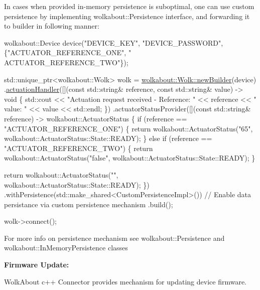 In cases when provided in-\/memory persistence is suboptimal, one can use custom persistence by implementing wolkabout\+::\+Persistence interface, and forwarding it to builder in following manner\+:


\begin{DoxyCode}
wolkabout::Device device(\textcolor{stringliteral}{"DEVICE\_KEY"}, \textcolor{stringliteral}{"DEVICE\_PASSWORD"}, \{\textcolor{stringliteral}{"ACTUATOR\_REFERENCE\_ONE"}, \textcolor{stringliteral}{"
      ACTUATOR\_REFERENCE\_TWO"}\});

std::unique\_ptr<wolkabout::Wolk> wolk =
  \hyperlink{classwolkabout_1_1_wolk_a91270bb8552c2dee634e552111db4bb0}{wolkabout::Wolk::newBuilder}(device)
    .\hyperlink{classwolkabout_1_1_wolk_builder_a5c8799ad21b6bb0f0c866af3295a69b7}{actuationHandler}([](\textcolor{keyword}{const} std::string& reference, \textcolor{keyword}{const} std::string& value) -> \textcolor{keywordtype}{void} \{
        std::cout << \textcolor{stringliteral}{"Actuation request received - Reference: "} << reference << \textcolor{stringliteral}{" value: "} << value << 
      std::endl;
    \})
    .actuatorStatusProvider([](\textcolor{keyword}{const} std::string& reference) -> wolkabout::ActuatorStatus \{
        \textcolor{keywordflow}{if} (reference == \textcolor{stringliteral}{"ACTUATOR\_REFERENCE\_ONE"}) \{
            \textcolor{keywordflow}{return} wolkabout::ActuatorStatus(\textcolor{stringliteral}{"65"}, wolkabout::ActuatorStatus::State::READY);
        \} \textcolor{keywordflow}{else} \textcolor{keywordflow}{if} (reference == \textcolor{stringliteral}{"ACTUATOR\_REFERENCE\_TWO"}) \{
            \textcolor{keywordflow}{return} wolkabout::ActuatorStatus(\textcolor{stringliteral}{"false"}, wolkabout::ActuatorStatus::State::READY);
        \}

        \textcolor{keywordflow}{return} wolkabout::ActuatorStatus(\textcolor{stringliteral}{""}, wolkabout::ActuatorStatus::State::READY);
    \})
    .withPersistence(std::make\_shared<CustomPersistenceImpl>()) \textcolor{comment}{// Enable data persistance via custom
       persistence mechanism}
    .build();

    wolk->connect();
\end{DoxyCode}


For more info on persistence mechanism see wolkabout\+::\+Persistence and wolkabout\+::\+In\+Memory\+Persistence classes

{\bfseries Firmware Update\+:}

Wolk\+About c++ Connector provides mechanism for updating device firmware.

